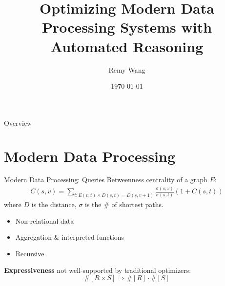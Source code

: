 \documentclass{beamer}
\title{Optimizing Modern Data Processing Systems with Automated Reasoning}
\date{\today}
\author{Remy Wang}
\institute{University of Washington}
\begin{document}
  \maketitle

  \begin{frame}{Overview}
    \tableofcontents
  \end{frame}

  \section{Modern Data Processing}

  \begin{frame}{Modern Data Processing: Queries}
    Betweenness centrality of a graph $E$:
    \begin{align*}
      C(s, v) = \sum_{t: E(v, t) \wedge D(s, t)=D(s, v+1)} 
      \frac{\sigma(s, v)}{\sigma(s, t)}(1+ C(s, t))
    \end{align*}
    where $D$ is the distance, $\sigma$ is the \# of shortest paths. \pause
    \begin{itemize}
      \item Non-relational data \pause
      \item Aggregation \& interpreted functions \pause
      \item Recursive \pause
     \end{itemize}
    \textbf{Expressiveness} not well-supported by traditional optimizers:
    \[\#[R \times S] \Rightarrow \#[R] \cdot \#[S]\]
  \end{frame}
\end{document}

